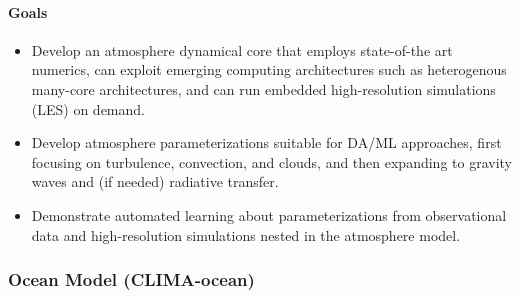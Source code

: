 \documentclass{article}
\begin{document}
\paragraph{Goals}
\begin{itemize}
    \item Develop an atmosphere dynamical core that employs state-of-the art numerics, can exploit emerging computing architectures such as heterogenous many-core architectures, and can run embedded high-resolution simulations (LES) on demand.
    \item Develop atmosphere parameterizations suitable for DA/ML approaches, first focusing on turbulence, convection, and clouds, and then expanding to gravity waves \citep{Alexander10a} and (if needed) radiative transfer.
    \item Demonstrate automated learning about parameterizations from observational data and high-resolution simulations nested in the atmosphere model.
\end{itemize}

\subsubsection{Ocean Model (CLIMA-ocean)}
\end{document}
